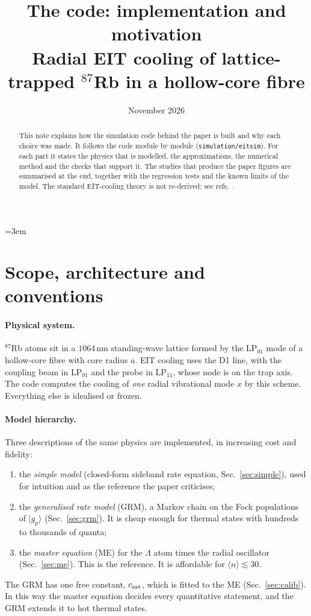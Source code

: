 \documentclass[11pt,a4paper]{article}
\title{The \code{eitsim} code: implementation and motivation\\[2pt]
\large Radial EIT cooling of lattice-trapped $^{87}$Rb in a hollow-core fibre}
\author{}
\date{November 2026}
\newcommand{\ket}[1]{|#1\rangle}
\newcommand{\gp}{\ket{g_p}}
\newcommand{\code}[1]{\texttt{#1}}
\newcommand{\SI}[2]{\ensuremath{#1\,\mathrm{#2}}}
\begin{document}
\emergencystretch=3em
\maketitle

\begin{abstract}
This note explains how the simulation code behind the paper is built and why each choice was made. It follows the code module by module (\code{simulation/eitsim}). For each part it states the physics that is modelled, the approximations, the numerical method and the checks that support it. The studies that produce the paper figures are summarised at the end, together with the regression tests and the known limits of the model. The standard EIT-cooling theory is not re-derived; see refs.~\cite{morigi2000,morigi2003,roos2000}.
\end{abstract}

\tableofcontents

\section{Scope, architecture and conventions}
\paragraph{Physical system.} $^{87}$Rb atoms sit in a \SI{1064}{nm} standing-wave lattice formed by the LP$_{01}$ mode of a hollow-core fibre with core radius $a$. EIT cooling uses the D1 line, with the coupling beam in LP$_{01}$ and the probe in LP$_{11}$, whose node is on the trap axis. The code computes the cooling of \emph{one} radial vibrational mode $x$ by this scheme. Everything else is idealised or frozen.

\paragraph{Model hierarchy.} Three descriptions of the same physics are implemented, in increasing cost and fidelity:
\begin{enumerate}
\item the \emph{simple model} (closed-form sideband rate equation, Sec.~\ref{sec:simple}), used for intuition and as the reference the paper criticises;
\item the \emph{generalised rate model} (GRM), a Markov chain on the Fock populations of $\gp$ (Sec.~\ref{sec:grm}). It is cheap enough for thermal states with hundreds to thousands of quanta;
\item the \emph{master equation} (ME) for the $\Lambda$ atom times the radial oscillator (Sec.~\ref{sec:me}). This is the reference. It is affordable for $\langle n\rangle\lesssim30$.
\end{enumerate}
The GRM has one free constant, $c_{\rm sat}$, which is fitted to the ME (Sec.~\ref{sec:calib}). In this way the master equation decides every quantitative statement, and the GRM extends it to hot thermal states.
\end{document}
